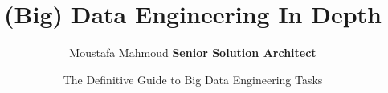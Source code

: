 \title[Data Engineering In Depth] %
{(Big) Data Engineering In Depth}



\author[Moustafa Mahmoud] {
	Moustafa Mahmoud \newline 	
	\footnotesize \textcolor{ballblue}{\textbf{Senior Solution Architect}} \newline
}

\date[\today] %
{The Definitive Guide to Big Data Engineering Tasks}



